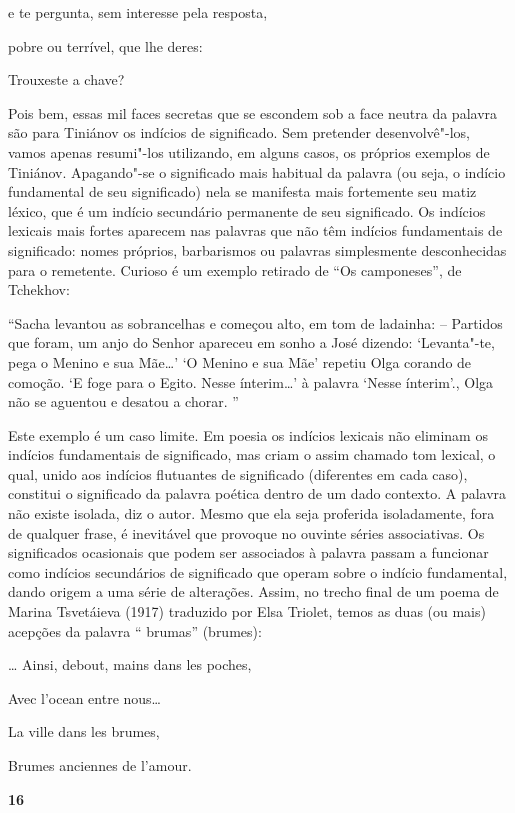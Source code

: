 e te pergunta, sem interesse pela resposta,

pobre ou terrível, que lhe deres:

Trouxeste a chave?

Pois bem, essas mil faces secretas que se escondem sob a face neutra da
palavra são para Tiniánov os indícios de significado. Sem pretender
desenvolvê"-los, vamos apenas resumi"-los utilizando, em alguns casos, os
próprios exemplos de Tiniánov. Apagando"-se o significado mais habitual
da palavra (ou seja, o indício fundamental de seu significado) nela se
manifesta mais fortemente seu matiz léxico, que é um indício secundário
permanente de seu significado. Os indícios lexicais mais fortes aparecem
nas palavras que não têm indícios fundamentais de significado: nomes
próprios, barbarismos ou palavras simplesmente desconhecidas para o
remetente. Curioso é um exemplo retirado de ``Os camponeses'', de
Tchekhov:

``Sacha levantou as sobrancelhas e começou alto, em tom de ladainha: --
Partidos que foram, um anjo do Senhor apareceu em sonho a José dizendo:
`Levanta"-te, pega o Menino e sua Mãe\ldots{}' `O Menino e sua Mãe' repetiu
Olga corando de comoção. `E foge para o Egito. Nesse ínterim\ldots{}' à
palavra `Nesse ínterim'., Olga não se aguentou e desatou a chorar. ''

Este exemplo é um caso limite. Em poesia os indícios lexicais não
eliminam os indícios fundamentais de significado, mas criam o assim
chamado tom lexical, o qual, unido aos indícios flutuantes de
significado (diferentes em cada caso), constitui o significado da
palavra poética dentro de um dado contexto. A palavra não existe
isolada, diz o autor. Mesmo que ela seja proferida isoladamente, fora de
qualquer frase, é inevitável que provoque no ouvinte séries
associativas. Os significados ocasionais que podem ser associados à
palavra passam a funcionar como indícios secundários de significado que
operam sobre o indício fundamental, dando origem a uma série de
alterações. Assim, no trecho final de um poema de Marina Tsvetáieva
(1917) traduzido por Elsa Triolet, temos as duas (ou mais) acepções da
palavra `` brumas'' (brumes):

\ldots{} Ainsi, debout, mains dans les poches,

Avec l'ocean entre nous\ldots{}

La ville dans les brumes,

Brumes anciennes de l'amour.

\textbf{16}


